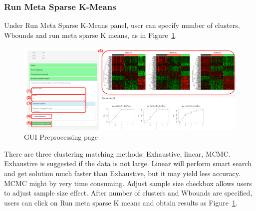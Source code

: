 \subsubsection{Run Meta Sparse K-Means}
Under Run Meta Sparse K-Means panel,
user can specify number of clusters, Wbounds and run meta sparse K means, 
as in Figure~\ref{fig:mskmRes}.
\begin{figure}[H]
\begin{center}
\includegraphics[scale=0.35]{./figure/metaClust/mskmRes}
\caption{GUI Preprocessing page}
\label{fig:mskmRes}
\end{center}
\end{figure}
There are three clustering matching methods: Exhaustive, linear, MCMC.
Exhaustive is suggested if the data is not large.
Linear will perform smart search and get solution much faster than Exhaustive, 
but it may yield less accuracy.
MCMC might by very time consuming.
Adjust sample size checkbox allows users to adjust sample size effect.
After number of clusters and Wbounds are specified,
users can click on Run meta sparse K means and obtain results as Figure~\ref{fig:mskmRes}.
